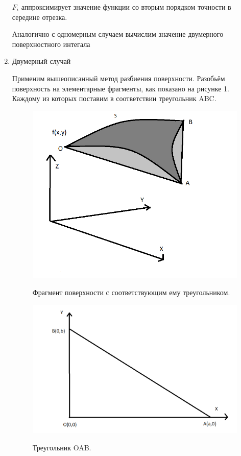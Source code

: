 \documentclass{article}
\begin{document}
\begin{enumerate}
$F_i$ аппроксимирует значение функции со вторым порядком точности \cite{litlink:samarskiy} в середине отрезка.

Аналогично с одномерным случаем вычислим значение двумерного поверхностного интегала

\item Двумерный случай

Применим вышеописанный метод разбиения поверхности. Разобьём поверхность на элементарные фрагменты, как показано на рисунке 1. Каждому из которых поставим в соответствии треугольник ABC.

\begin{figure}[H]
\centering
\includegraphics[width=0.8\linewidth]{triangleL.png}
\caption[]{}
\label{fig:L}
Фрагмент поверхности с соответствующим ему треугольником.
\end{figure}

\begin{figure}[H]
\centering
\includegraphics[width=0.8\linewidth]{triangleOAB.png}
\caption[]{}
\label{fig:ABC}
Треугольник OAB.
\end{figure}


\end{enumerate}
\end{document}
